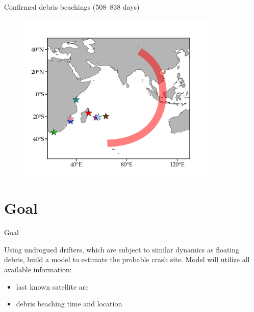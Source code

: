 \documentclass{beamer}
\begin{document}
\begin{frame}{Confirmed debris beachings (508--838 days)}  

\begin{figure}[hbt]
  \includegraphics[width=0.85\textwidth]{figures/debris_map.png}
\end{figure}

\end{frame}

\section{Goal}
\begin{frame}{Goal}  

Using undrogued drifters,  which are subject to similar dynamics as floating debris, build a model to estimate the probable crash site.
\newline\newline
Model will utilize all available information:
\begin{itemize}
	\item last known satellite arc 
	\item debris beaching time and location
\end{itemize} 
\end{frame}
\end{document}
